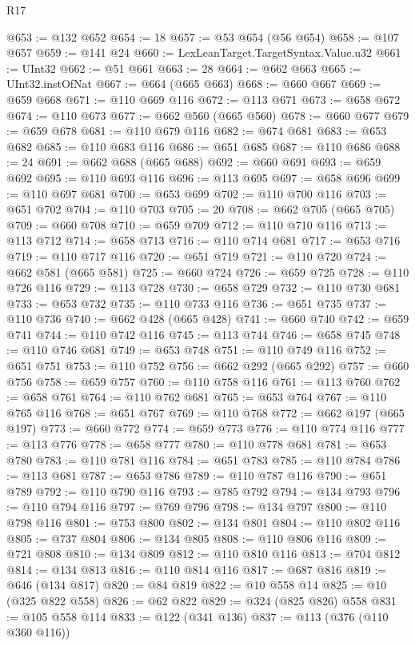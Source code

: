 \begin{lexlean}{R17}
\begin{coremodule}
@653 := @132 @652
@654 := 18
@657 := @53 @654 (@56 @654)
@658 := @107 @657
@659 := @141 @24
@660 := LexLeanTarget.TargetSyntax.Value.u32
@661 := UInt32
@662 := @51 @661
@663 := 28
@664 := @662 @663
@665 := UInt32.instOfNat
@667 := @664 (@665 @663)
@668 := @660 @667
@669 := @659 @668
@671 := @110 @669 @116
@672 := @113 @671
@673 := @658 @672
@674 := @110 @673
@677 := @662 @560 (@665 @560)
@678 := @660 @677
@679 := @659 @678
@681 := @110 @679 @116
@682 := @674 @681
@683 := @653 @682
@685 := @110 @683 @116
@686 := @651 @685
@687 := @110 @686
@688 := 24
@691 := @662 @688 (@665 @688)
@692 := @660 @691
@693 := @659 @692
@695 := @110 @693 @116
@696 := @113 @695
@697 := @658 @696
@699 := @110 @697 @681
@700 := @653 @699
@702 := @110 @700 @116
@703 := @651 @702
@704 := @110 @703
@705 := 20
@708 := @662 @705 (@665 @705)
@709 := @660 @708
@710 := @659 @709
@712 := @110 @710 @116
@713 := @113 @712
@714 := @658 @713
@716 := @110 @714 @681
@717 := @653 @716
@719 := @110 @717 @116
@720 := @651 @719
@721 := @110 @720
@724 := @662 @581 (@665 @581)
@725 := @660 @724
@726 := @659 @725
@728 := @110 @726 @116
@729 := @113 @728
@730 := @658 @729
@732 := @110 @730 @681
@733 := @653 @732
@735 := @110 @733 @116
@736 := @651 @735
@737 := @110 @736
@740 := @662 @428 (@665 @428)
@741 := @660 @740
@742 := @659 @741
@744 := @110 @742 @116
@745 := @113 @744
@746 := @658 @745
@748 := @110 @746 @681
@749 := @653 @748
@751 := @110 @749 @116
@752 := @651 @751
@753 := @110 @752
@756 := @662 @292 (@665 @292)
@757 := @660 @756
@758 := @659 @757
@760 := @110 @758 @116
@761 := @113 @760
@762 := @658 @761
@764 := @110 @762 @681
@765 := @653 @764
@767 := @110 @765 @116
@768 := @651 @767
@769 := @110 @768
@772 := @662 @197 (@665 @197)
@773 := @660 @772
@774 := @659 @773
@776 := @110 @774 @116
@777 := @113 @776
@778 := @658 @777
@780 := @110 @778 @681
@781 := @653 @780
@783 := @110 @781 @116
@784 := @651 @783
@785 := @110 @784
@786 := @113 @681
@787 := @653 @786
@789 := @110 @787 @116
@790 := @651 @789
@792 := @110 @790 @116
@793 := @785 @792
@794 := @134 @793
@796 := @110 @794 @116
@797 := @769 @796
@798 := @134 @797
@800 := @110 @798 @116
@801 := @753 @800
@802 := @134 @801
@804 := @110 @802 @116
@805 := @737 @804
@806 := @134 @805
@808 := @110 @806 @116
@809 := @721 @808
@810 := @134 @809
@812 := @110 @810 @116
@813 := @704 @812
@814 := @134 @813
@816 := @110 @814 @116
@817 := @687 @816
@819 := @646 (@134 @817)
@820 := @84 @819
@822 := @10 @558 @14
@825 := @10 (@325 @822 @558)
@826 := @62 @822
@829 := @324 (@825 @826) @558
@831 := @105 @558 @114
@833 := @122 (@341 @136)
@837 := @113 (@376 (@110 @360 @116))

\end{coremodule}
\end{lexlean}

